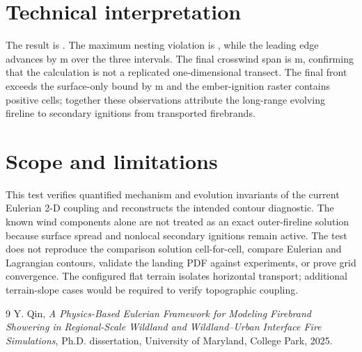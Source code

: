 \section{Technical interpretation}
The result is \textbf{}. The maximum nesting violation is , while the leading edge advances by  m over the three intervals. The final crosswind span is  m, confirming that the calculation is not a replicated one-dimensional transect. The final front exceeds the surface-only bound by  m and the ember-ignition raster contains  positive cells; together these observations attribute the long-range evolving fireline to secondary ignitions from transported firebrands.

\section{Scope and limitations}
This test verifies quantified mechanism and evolution invariants of the current Eulerian 2-D coupling and reconstructs the intended contour diagnostic. The known wind components alone are not treated as an exact outer-fireline solution because surface spread and nonlocal secondary ignitions remain active. The test does not reproduce the comparison solution cell-for-cell, compare Eulerian and Lagrangian contours, validate the landing PDF against experiments, or prove grid convergence. The configured flat terrain isolates horizontal transport; additional terrain-slope cases would be required to verify topographic coupling.

\begin{thebibliography}{9}
Y. Qin, \emph{A Physics-Based Eulerian Framework for Modeling Firebrand
Showering in Regional-Scale Wildland and Wildland--Urban Interface Fire
Simulations}, Ph.D. dissertation, University of Maryland, College Park, 2025.
\end{thebibliography}
